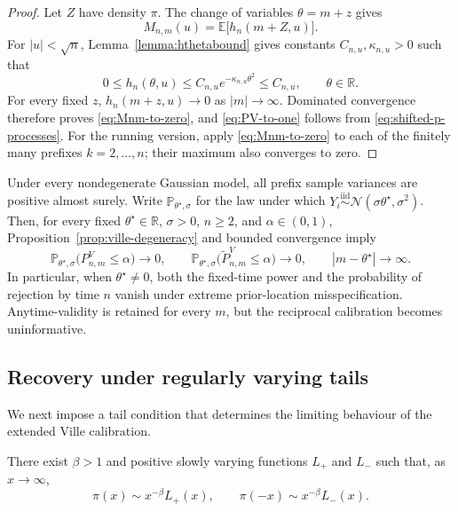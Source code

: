 \begin{proof}
Let \(Z\) have density \(\pi\).  The change of variables
\(\theta=m+z\) gives
\[
  M_{n,m}(u)
  =
  \mathbb E\bigl[h_n(m+Z,u)\bigr].
\]
For \(\lvert u\rvert<\sqrt n\), Lemma~\ref{lemma:hthetabound} gives
constants \(C_{n,u},\kappa_{n,u}>0\) such that
\[
  0
  \leq
  h_n(\theta,u)
  \leq
  C_{n,u}e^{-\kappa_{n,u}\theta^2}
  \leq
  C_{n,u},
  \qquad \theta\in\mathbb R.
\]
For every fixed \(z\),
\(h_n(m+z,u)\to0\) as \(|m|\to\infty\).  Dominated convergence
therefore proves \eqref{eq:Mnm-to-zero}, and
\eqref{eq:PV-to-one} follows from \eqref{eq:shifted-p-processes}.
For the running version, apply \eqref{eq:Mnm-to-zero} to each of the
finitely many prefixes \(k=2,\ldots,n\); their maximum also converges
to zero.
\end{proof}

Under every nondegenerate Gaussian model, all prefix sample variances
are positive almost surely.  Write \(\mathbb P_{\theta^\star,\sigma}\)
for the law under which
\(Y_i\stackrel{\mathrm{iid}}{\sim}
\mathcal N(\sigma\theta^\star,\sigma^2)\).  Then, for every fixed
\(\theta^\star\in\mathbb R\), \(\sigma>0\),
\(n\geq2\), and \(\alpha\in(0,1)\), Proposition~\ref{prop:ville-degeneracy}
and bounded convergence imply
\begin{equation}
\label{eq:ville-power-zero}
  \mathbb P_{\theta^\star,\sigma}
  \bigl(P_{n,m}^V\leq\alpha\bigr)
  \longrightarrow0,
  \qquad
  \mathbb P_{\theta^\star,\sigma}
  \bigl(\widetilde P_{n,m}^V\leq\alpha\bigr)
  \longrightarrow0,
  \qquad |m-\theta^\star|\to\infty.
\end{equation}
In particular, when \(\theta^\star\neq0\), both the fixed-time power
and the probability of rejection by time \(n\) vanish under extreme
prior-location misspecification.  Anytime-validity is retained for
every \(m\), but the reciprocal calibration becomes uninformative.


\subsection{Recovery under regularly varying tails}
\label{subsec:recovery}

We next impose a tail condition that determines the limiting behaviour
of the extended Ville calibration.

\begin{assumption}
\label{ass:tails}
There exist \(\beta>1\) and positive slowly varying functions
\(L_+\) and \(L_-\) such that, as \(x\to\infty\),
\begin{equation}
\label{eq:regularly-varying-tails}
  \pi(x)
  \sim
  x^{-\beta}L_+(x),
  \qquad
  \pi(-x)
  \sim
  x^{-\beta}L_-(x).
\end{equation}
\end{assumption}


